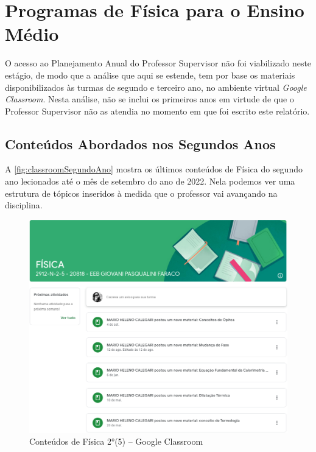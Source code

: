 \chapter{Programas de Física para o Ensino Médio}
\thispagestyle{empty}
\label{cap: prgFisica}
O acesso ao Planejamento Anual do Professor Supervisor não foi viabilizado neste estágio, de modo que a análise que aqui se estende, tem por base os materiais disponibilizados às turmas de segundo e terceiro ano, no ambiente virtual \emph{Google Classroom}. Nesta análise, não se inclui os primeiros anos em virtude de que o Professor Supervisor não as atendia no momento em que foi escrito este relatório.

\section{Conteúdos Abordados nos Segundos Anos}
A \autoref{fig:classroomSegundoAno} mostra os últimos conteúdos de Física do segundo ano lecionados até o mês de setembro do ano de 2022. Nela podemos ver uma estrutura de tópicos inseridos à medida que o professor vai avançando na disciplina.
\vspace{.5cm} 
\begin{figure}[!htpb]
    \begin{center}
        \includegraphics[width=.95\textwidth]{03-elementos/03.2_textual/03.2.1_fig/programaFisica2-5.png}
        \caption{Conteúdos de Física 2°(5) -- Google Classroom}
        \label{fig:classroomSegundoAno}
    \end{center}    
\end{figure}

